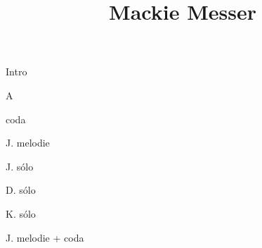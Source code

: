 \documentclass[timestamp]{jazzgrid}
\title{Mackie Messer}
\begin{document}
\maketitle
\begin{musicsection}{Intro}
\barline
	{}
	{}
	{}
	{}
\end{musicsection}
\begin{musicsection}{A}
\barline
	{}
	{\barfour{}{}{}{}{}}
	{}
	{\barfour{}{}{}{}{}}
\barline
	{}
	{\barfour{}{}{}{}{}}
	{}
	{\barfour{}{}{}{}{}}
\barline
	{}
	{\barfour{}{\chord{}}{}{}{}}
	{}
	{\barfour{}{\chord{}}{}{}{}}
\barline
	{}
	{\barfour{}{}{}{}{}}
	{}
	{}
\end{musicsection}
\begin{musicsection}{coda}
	{}
	{}
	{}
\end{musicsection}

\begin{multicols*}{2}
\begin{description}[noitemsep,align=right,labelwidth=\widthof{\bfseries{\scriptsize Intro}}]
	\scriptsize
	\item [Intro]
	\item [A] J. melodie
	\item [4$\times$A] J. sólo
	\item [4$\times$A] D. sólo
	\item [A] K. sólo
	\item [AA] J. melodie + coda
\end{description}

\end{multicols*}
\end{document}
